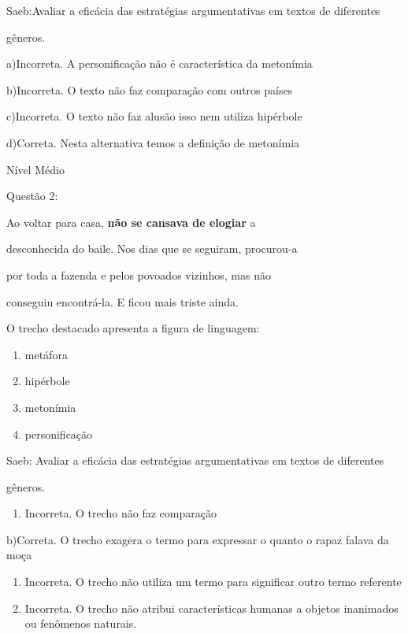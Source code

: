 {Saeb:Avaliar a eficácia das estratégias argumentativas em textos de
diferentes

gêneros.

a)Incorreta. A personificação não é característica da metonímia

b)Incorreta. O texto não faz comparação com outros países

c)Incorreta. O texto não faz alusão isso nem utiliza hipérbole

d)Correta. Nesta alternativa temos a definição de metonímia

Nível Médio

Questão 2:

Ao voltar para casa, \textbf{não se cansava de elogiar} a

desconhecida do baile. Nos dias que se seguiram, procurou-a

por toda a fazenda e pelos povoados vizinhos, mas não

conseguiu encontrá-la. E ficou mais triste ainda.

O trecho destacado apresenta a figura de linguagem:

\begin{enumerate}
\def\labelenumi{\alph{enumi})}
\item
  metáfora
\item
  hipérbole
\item
  metonímia
\item
  personificação
\end{enumerate}

Saeb: Avaliar a eficácia das estratégias argumentativas em textos de
diferentes

gêneros.

\begin{enumerate}
\def\labelenumi{\arabic{enumi}.}
\tightlist
\item
  Incorreta. O trecho não faz comparação
\end{enumerate}

b)Correta. O trecho exagera o termo para expressar o quanto o rapaz
falava da moça

\begin{enumerate}
\def\labelenumi{\arabic{enumi}.}
\item
  Incorreta. O trecho não utiliza um termo para significar outro termo
  referente
\item
  Incorreta. O trecho não atribui características humanas a objetos
  inanimados ou fenômenos naturais.
\end{enumerate}

}
